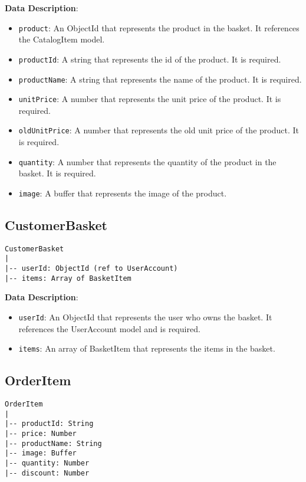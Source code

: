 \textbf{Data Description}:

\begin{itemize}
    \item \texttt{product}: An ObjectId that represents the product in the basket. It references the CatalogItem model.
    \item \texttt{productId}: A string that represents the id of the product. It is required.
    \item \texttt{productName}: A string that represents the name of the product. It is required.
    \item \texttt{unitPrice}: A number that represents the unit price of the product. It is required.
    \item \texttt{oldUnitPrice}: A number that represents the old unit price of the product. It is required.
    \item \texttt{quantity}: A number that represents the quantity of the product in the basket. It is required.
    \item \texttt{image}: A buffer that represents the image of the product.
\end{itemize}

\subsection{CustomerBasket}

\begin{verbatim}
CustomerBasket
|
|-- userId: ObjectId (ref to UserAccount)
|-- items: Array of BasketItem
\end{verbatim}

\textbf{Data Description}:

\begin{itemize}
    \item \texttt{userId}: An ObjectId that represents the user who owns the basket. It references the UserAccount model and is required.
    \item \texttt{items}: An array of BasketItem that represents the items in the basket.
\end{itemize}

\subsection{OrderItem}

\begin{verbatim}
OrderItem
|
|-- productId: String
|-- price: Number
|-- productName: String
|-- image: Buffer
|-- quantity: Number
|-- discount: Number
\end{verbatim}

